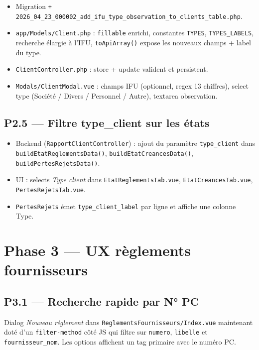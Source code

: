 \documentclass[11pt,a4paper]{article}
\newcommand{\modfile}[1]{\texttt{\small #1}}
\newcommand{\newfile}[1]{\texttt{\small\textcolor{accent}{+ #1}}}
\begin{document}
\begin{itemize}[leftmargin=1.4em]
  \item Migration \newfile{2026\_04\_23\_000002\_add\_ifu\_type\_observation\_to\_clients\_table.php}.
  \item \modfile{app/Models/Client.php} : \texttt{fillable} enrichi, constantes
    \texttt{TYPES}, \texttt{TYPES\_LABELS}, recherche élargie à l'IFU,
    \texttt{toApiArray()} expose les nouveaux champs + label du type.
  \item \modfile{ClientController.php} : store + update valident et persistent.
  \item \modfile{Modals/ClientModal.vue} : champs IFU (optionnel, regex 13 chiffres),
    select type (Société / Divers / Personnel / Autre), textarea observation.
\end{itemize}

\subsection{P2.5 --- Filtre type\_client sur les états}

\begin{itemize}[leftmargin=1.4em]
  \item Backend (\modfile{RapportClientController}) : ajout du paramètre
    \texttt{type\_client} dans \texttt{buildEtatReglementsData()},
    \texttt{buildEtatCreancesData()}, \texttt{buildPertesRejetsData()}.
  \item UI : selects \emph{Type client} dans \modfile{EtatReglementsTab.vue},
    \modfile{EtatCreancesTab.vue}, \modfile{PertesRejetsTab.vue}.
  \item \modfile{PertesRejets} émet \texttt{type\_client\_label} par ligne et
    affiche une colonne Type.
\end{itemize}

\newpage

\section{Phase 3 --- UX règlements fournisseurs}

\subsection{P3.1 --- Recherche rapide par N° PC}

Dialog \emph{Nouveau règlement} dans \modfile{ReglementsFournisseurs/Index.vue}
maintenant doté d'un \texttt{filter-method} côté JS qui filtre sur
\texttt{numero}, \texttt{libelle} et \texttt{fournisseur\_nom}. Les options
affichent un tag primaire avec le numéro PC.
\end{document}
